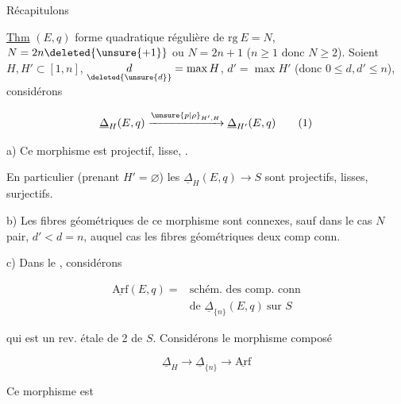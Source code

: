 
Récapitulons

\uline{Thm} $(E,q)$ forme quadratique régulière de $\mathrm{rg}\ E=N$, $N=2n\deleted{\unsure{+1}}$ ou $N=2n+1$ ($n\geq1$ donc $N\geq2$). Soient $H,H'\subset[1,n]$, $\underset{\deleted{\unsure{d}}}{d}=\max H$, $d'=\max H'$ (donc $0\leq d,d'\leq n$), considérons

\[
\underline\Delta_H(E,q)\xrightarrow{\unsure{p|\rho}_{H',H}}\underline\Delta_{H'}(E,q)\tag*{(1)}
\]

a) Ce morphisme est projectif,  lisse,  .

 En particulier (prenant $H'=\varnothing$) les $\underline\Delta_H(E,q)\to S$ sont projectifs, lisses, surjectifs.

b) Les fibres géométriques de ce morphisme sont  connexes, sauf dans le cas $N$ pair, $d'<d=n$, auquel cas les fibres géométriques  deux comp conn.

c) Dans le  , considérons

\[
\begin{aligned}
\underline{\mathrm{Arf}}(E,q)={}&\text{schém. des comp. conn}\\
&\text{de }\underline\Delta_{\{n\}}(E,q)\ \text{sur }S
\end{aligned}
\]

qui est un rev. étale de  2 de $S$. Considérons  le  morphisme composé

\[
\underline\Delta_H\longrightarrow\underline\Delta_{\{n\}}\longrightarrow\underline{\mathrm{Arf}}
\]

 Ce morphisme est

